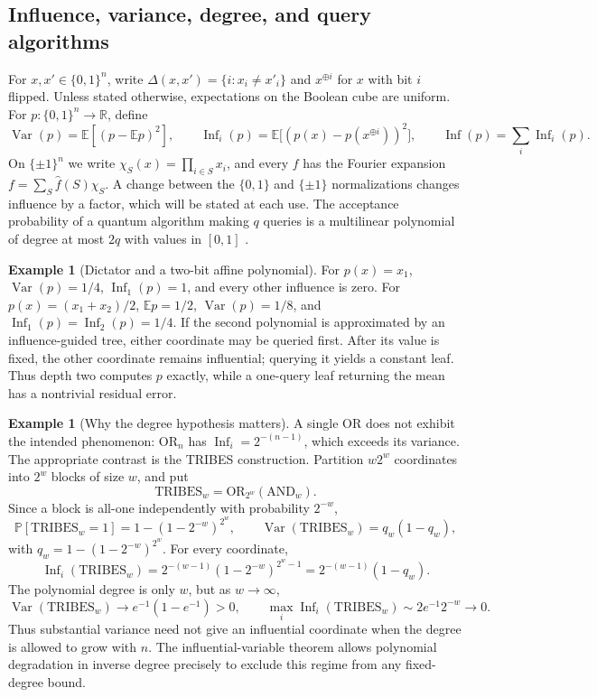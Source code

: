 \documentclass[11pt]{article}
\theoremstyle{definition}\newtheorem{definition}[theorem]{Definition}
\newtheorem{example}[theorem]{Example}
\theoremstyle{remark}\newtheorem{remark}[theorem]{Remark}
\newcommand{\E}{\mathbb E}\newcommand{\Prb}{\mathbb P}
\DeclareMathOperator{\Inf}{Inf}\DeclareMathOperator{\Var}{Var}
\begin{document}
\subsection{Influence, variance, degree, and query algorithms}
For \(x,x'\in\{0,1\}^n\), write \(\Delta(x,x')=\{i:x_i\ne x'_i\}\) and \(x^{\oplus i}\) for \(x\) with bit \(i\) flipped. Unless stated otherwise, expectations on the Boolean cube are uniform. For \(p:\{0,1\}^n\to\mathbb R\), define
\[
 \Var(p)=\E[(p-\E p)^2],\qquad
 \Inf_i(p)=\E\bigl[(p(x)-p(x^{\oplus i}))^2\bigr],\qquad
 \Inf(p)=\sum_i\Inf_i(p).
\]
On \(\{\pm1\}^n\) we write \(\chi_S(x)=\prod_{i\in S}x_i\), and every \(f\) has the Fourier expansion \(f=\sum_S\hat f(S)\chi_S\). A change between the \(\{0,1\}\) and \(\{\pm1\}\) normalizations changes influence by a factor, which will be stated at each use. The acceptance probability of a quantum algorithm making \(q\) queries is a multilinear polynomial of degree at most \(2q\) with values in \([0,1]\) \cite{BBCMW01}.

\begin{example}[Dictator and a two-bit affine polynomial]
For \(p(x)=x_1\), \(\Var(p)=1/4\), \(\Inf_1(p)=1\), and every other influence is zero. For \(p(x)=(x_1+x_2)/2\), \(\E p=1/2\), \(\Var(p)=1/8\), and \(\Inf_1(p)=\Inf_2(p)=1/4\). If the second polynomial is approximated by an influence-guided tree, either coordinate may be queried first. After its value is fixed, the other coordinate remains influential; querying it yields a constant leaf. Thus depth two computes \(p\) exactly, while a one-query leaf returning the mean has a nontrivial residual error.
\end{example}

\begin{example}[Why the degree hypothesis matters]
A single OR does not exhibit the intended phenomenon: \(\mathrm{OR}_n\) has \(\Inf_i=2^{-(n-1)}\), which exceeds its variance. The appropriate contrast is the TRIBES construction. Partition \(w2^w\) coordinates into \(2^w\) blocks of size \(w\), and put
\[
 \mathrm{TRIBES}_w=\mathrm{OR}_{2^w}(\mathrm{AND}_w).
\]
Since a block is all-one independently with probability \(2^{-w}\),
\[
 \Prb[\mathrm{TRIBES}_w=1]=1-(1-2^{-w})^{2^w},\qquad
 \Var(\mathrm{TRIBES}_w)=q_w(1-q_w),
\]
with \(q_w=1-(1-2^{-w})^{2^w}\). For every coordinate,
\[
 \Inf_i(\mathrm{TRIBES}_w)=2^{-(w-1)}(1-2^{-w})^{2^w-1}=2^{-(w-1)}(1-q_w).
\]
The polynomial degree is only \(w\), but as \(w\to\infty\),
\[
 \Var(\mathrm{TRIBES}_w)\to e^{-1}(1-e^{-1})>0,\qquad
 \max_i\Inf_i(\mathrm{TRIBES}_w)\sim2e^{-1}2^{-w}\to0.
\]
Thus substantial variance need not give an influential coordinate when the degree is allowed to grow with \(n\). The influential-variable theorem allows polynomial degradation in inverse degree precisely to exclude this regime from any fixed-degree bound.
\end{example}
\end{document}
